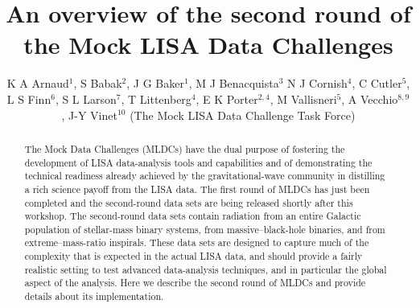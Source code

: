 \documentclass{iopart}
\begin{document}
\title[The second round of Mock LISA Data Challenges]{An overview of the second round of the Mock LISA Data Challenges}

\author{K A Arnaud$^1$,
S Babak$^2$,
J G Baker$^1$,
M J Benacquista$^3$
N J Cornish$^4$,
C Cutler$^5$,
L S Finn$^6$,
S L Larson$^7$,
T Littenberg$^4$,
E K Porter$^{2,4}$,
M Vallisneri$^5$,
A Vecchio$^{8,9}$,
J-Y Vinet$^{10}$ (The Mock LISA Data Challenge Task Force)}

\address{$^1$ Gravitational Astrophysics Laboratory, NASA Goddard Space Flight Center, 8800 Greenbelt Road, Greenbelt, MD 20771, US}
\address{$^2$ Max-Planck-Institut f\"{u}r Gravitationsphysik (Albert-Einstein-Institut), Am M\"{u}hlenberg 1, D-14476 Golm bei Potsdam, Germany}
\address{$^3$ Center for Gravitational Wave Astronomy, University of Texas at Brownsville, Brownsville, TX 78520, US}
\address{$^4$ Dept.\ of Phys., Montana State University, Bozeman, MT 59717, US}
\address{$^{5}$ Jet Propulsion Laboratory, California Institute of Technology, Pasadena, CA 91109, US}
\address{$^{6}$ Center for Gravitational Wave Physics, The Pennsylvania State University, University Park, PA 16802, US}
\address{$^{7}$ Dept.\ of Phys., Weber State University, 2508 University of Circle, Ogden, UT 84408, US}
\address{$^{8}$ School of Phys.\ and Astron., University of Birmingham, Edgbaston, Birmingham B152TT, UK}
\address{$^{9}$ Dept.\ of Phys.\ and Astron., Northwestern University, Evanston, IL 60208, US}
\address{$^{10}$ D\'epartement ARTEMIS, Observatoire de la C\^{o}te d'Azur, BP 429, 06304 Nice, France}
\begin{abstract}
The Mock Data Challenges (MLDCs) have the dual purpose of fostering the development of LISA data-analysis tools and capabilities and of demonstrating the technical readiness already achieved by the gravitational-wave community in distilling a rich science payoff from the LISA data. The first round of MLDCs has just been completed and the second-round data sets are being released shortly after this workshop. The second-round data sets contain radiation from an entire Galactic population of stellar-mass binary systems, from massive--black-hole binaries, and from extreme--mass-ratio inspirals. These data sets are designed to capture much of the complexity that is expected in the actual LISA data, and should provide a fairly realistic setting to test advanced data-analysis techniques, and in particular the global aspect of the analysis. Here we describe the second round of MLDCs and provide details about its implementation.
\end{abstract}
\end{document}
